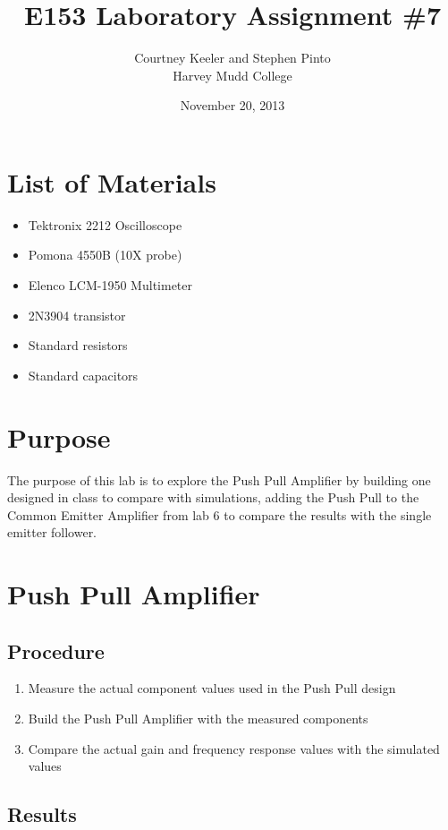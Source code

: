 \documentclass[12pt,letterpaper]{report}
\begin{document}
\title{E153 Laboratory Assignment \#7}
\author{Courtney Keeler and Stephen Pinto\\
Harvey Mudd College}
\date{November 20, 2013}
\maketitle

\section*{List of Materials}
\begin{itemize}
	\item Tektronix 2212 Oscilloscope
	\item Pomona 4550B (10X probe)
	\item Elenco LCM-1950 Multimeter
	\item 2N3904 transistor
	\item Standard resistors
	\item Standard capacitors
\end{itemize}

\section*{Purpose}
The purpose of this lab is to explore the Push Pull Amplifier by building one designed in class to compare with simulations, adding the Push Pull to the Common Emitter Amplifier from lab 6 to compare the results with the single emitter follower.

\section*{Push Pull Amplifier}
\subsection*{Procedure}

\begin{enumerate}
\item Measure the actual component values used in the Push Pull design
\item Build the Push Pull Amplifier with the measured components
\item Compare the actual gain and frequency response values with the simulated values
\end{enumerate}

\subsection*{Results}
\end{document}
